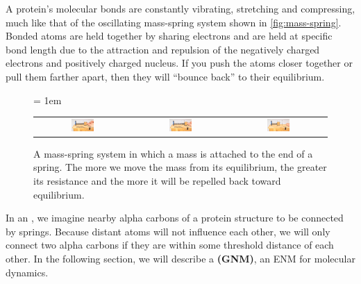 A protein's molecular bonds are constantly vibrating, stretching and compressing, much like that of the oscillating mass-spring system shown in \autoref{fig:mass-spring}. Bonded atoms are held together by sharing electrons and are held at specific bond length due to the attraction and repulsion of the negatively charged electrons and positively charged nucleus. If you push the atoms closer together or pull them farther apart, then they will ``bounce back'' to their equilibrium.

\begin{figure}[h]
	\centering
	\tabcolsep = 1em
	\mySfFamily
	\begin{tabular}{c c c}
		\includegraphics[width = 0.25\textwidth]{../images/mass_spring1.png} & \includegraphics[width = 0.25\textwidth]{../images/mass_spring2.png} & \includegraphics[width = 0.25\textwidth]{../images/mass_spring3.png}
	\end{tabular}
	\caption{A mass-spring system in which a mass is attached to the end of a spring. The more we move the mass from its equilibrium, the greater its resistance and the more it will be repelled back toward equilibrium.}
	\label{fig:mass-spring}
\end{figure}


In an , we imagine nearby alpha carbons of a protein structure to be connected by springs. Because distant atoms will not influence each other, we will only connect two alpha carbons if they are within some threshold distance of each other. In the following section, we will describe a  \textbf{(GNM)}, an ENM for molecular dynamics.

